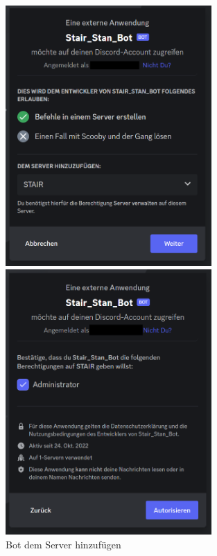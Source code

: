 \documentclass[a4paper, table]{article}
\begin{document}
\begin{figure}[h]
    \begin{minipage}[t]{0.5\textwidth}
        \includegraphics[width=0.7\textwidth]{img/apply_bot_to_server.png}
    \end{minipage}
    \begin{minipage}[t]{0.5\textwidth}
        \includegraphics[width=0.7\textwidth]{img/apply_bot_to_server_2.png}
    \end{minipage}
    \caption{Bot dem Server hinzufügen}
    \label{fig:apply-bot-to-server}
\end{figure}
\end{document}
